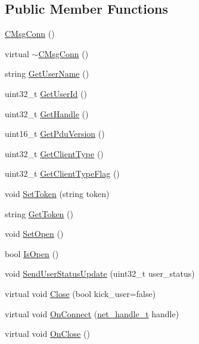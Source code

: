 \subsection*{Public Member Functions}
\begin{DoxyCompactItemize}
\item 
\hyperlink{class_c_msg_conn_a3268c029c2b02d31184d86dc9456f1e0}{C\+Msg\+Conn} ()
\item 
virtual \hyperlink{class_c_msg_conn_a4c0cce07871ec9cd8c13366060021198}{$\sim$\+C\+Msg\+Conn} ()
\item 
string \hyperlink{class_c_msg_conn_aee3dbea06b4ba33968f7a69d18350b54}{Get\+User\+Name} ()
\item 
uint32\+\_\+t \hyperlink{class_c_msg_conn_a30d95804fdbdab663863973c76b3cea2}{Get\+User\+Id} ()
\item 
uint32\+\_\+t \hyperlink{class_c_msg_conn_abca3c447b67a6f58f536f8bccda58385}{Get\+Handle} ()
\item 
uint16\+\_\+t \hyperlink{class_c_msg_conn_afaf5dea647445179b63ad941cc9aafad}{Get\+Pdu\+Version} ()
\item 
uint32\+\_\+t \hyperlink{class_c_msg_conn_a2a5dbfd57ce893d416d4235b01127d12}{Get\+Client\+Type} ()
\item 
uint32\+\_\+t \hyperlink{class_c_msg_conn_afeeb82af24db85a2ca37600b4e80cff4}{Get\+Client\+Type\+Flag} ()
\item 
void \hyperlink{class_c_msg_conn_a37ad0f18ae89c71df911251a326082cf}{Set\+Token} (string token)
\item 
string \hyperlink{class_c_msg_conn_aae96fea88a16f5f193501e887d2db238}{Get\+Token} ()
\item 
void \hyperlink{class_c_msg_conn_ae27791eeb71e25dc7e1e7fc0dcc49c9b}{Set\+Open} ()
\item 
bool \hyperlink{class_c_msg_conn_ad02569381b6893d61ab344f98f593520}{Is\+Open} ()
\item 
void \hyperlink{class_c_msg_conn_a9c2a8616f41100b10488b91fcee94c7f}{Send\+User\+Status\+Update} (uint32\+\_\+t user\+\_\+status)
\item 
virtual void \hyperlink{class_c_msg_conn_acc7f3dfb5c25ff8acc9a32654cb610fb}{Close} (bool kick\+\_\+user=false)
\item 
virtual void \hyperlink{class_c_msg_conn_af2f2c489ecfe2b905de0cbe698f95848}{On\+Connect} (\hyperlink{base_2ostype_8h_a5e1697fa312aa00ac7305460abf166fd}{net\+\_\+handle\+\_\+t} handle)
\item 
virtual void \hyperlink{class_c_msg_conn_ae90f18c503b5c089b745accea147e087}{On\+Close} ()

\end{DoxyCompactItemize}
